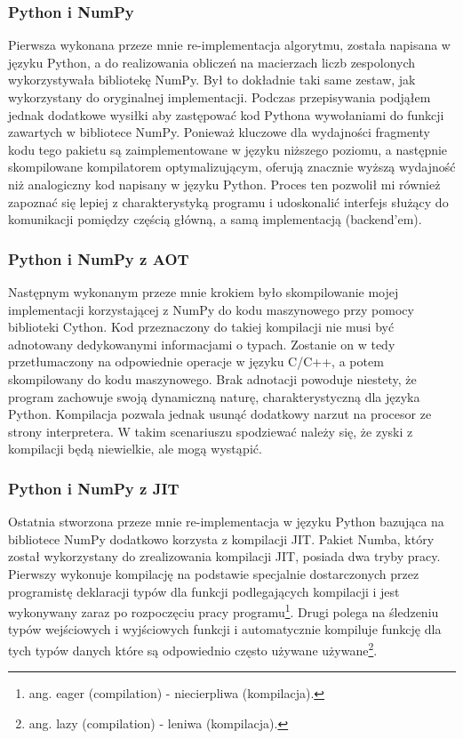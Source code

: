 \documentclass[11pt, a4paper]{article}
\begin{document}
\begin{sloppypar}
    \subsubsection{Python i NumPy}
    Pierwsza wykonana przeze mnie re-implementacja algorytmu, została napisana w języku
    Python, a do realizowania obliczeń na macierzach liczb zespolonych wykorzystywała bibliotekę
    NumPy. Był to dokładnie taki same zestaw, jak wykorzystany do oryginalnej implementacji.
    Podczas przepisywania podjąłem jednak dodatkowe wysiłki aby zastępować kod Pythona
    wywołaniami do funkcji zawartych w bibliotece NumPy. Ponieważ kluczowe dla wydajności
    fragmenty kodu tego pakietu są zaimplementowane w języku niższego poziomu, a
    następnie skompilowane kompilatorem optymalizującym, oferują znacznie wyższą wydajność
    niż analogiczny kod napisany w języku Python. Proces ten pozwolił mi również
    zapoznać się lepiej z charakterystyką programu i udoskonalić interfejs służący do
    komunikacji pomiędzy częścią główną, a samą implementacją (backend'em).

    \subsubsection{Python i NumPy z AOT}
    Następnym wykonanym przeze mnie krokiem było skompilowanie mojej implementacji korzystającej
    z NumPy do kodu maszynowego przy pomocy biblioteki Cython. Kod przeznaczony do
    takiej kompilacji nie musi być adnotowany dedykowanymi informacjami o typach. Zostanie
    on w tedy przetłumaczony na odpowiednie operacje w języku C/C++, a potem
    skompilowany do kodu maszynowego. Brak adnotacji powoduje niestety, że program
    zachowuje swoją dynamiczną naturę, charakterystyczną dla języka Python. Kompilacja
    pozwala jednak usunąć dodatkowy narzut na procesor ze strony interpretera. W takim scenariuszu
    spodziewać należy się, że zyski z kompilacji będą niewielkie, ale mogą wystąpić.

    \subsubsection{Python i NumPy z JIT}
    Ostatnia stworzona przeze mnie re-implementacja w języku Python bazująca na bibliotece
    NumPy dodatkowo korzysta z kompilacji JIT. Pakiet Numba, który został wykorzystany do
    zrealizowania kompilacji JIT, posiada dwa tryby pracy. Pierwszy wykonuje kompilację na
    podstawie specjalnie dostarczonych przez programistę deklaracji typów dla funkcji podlegających
    kompilacji i jest wykonywany zaraz po rozpoczęciu pracy programu\footnote{ang. eager
    (compilation) - niecierpliwa (kompilacja).}. Drugi polega na śledzeniu typów
    wejściowych i wyjściowych funkcji i automatycznie kompiluje funkcję dla tych typów
    danych które są odpowiednio często używane używane\footnote{ang. lazy (compilation)
    - leniwa (kompilacja).}.


\end{sloppypar}
\end{document}

